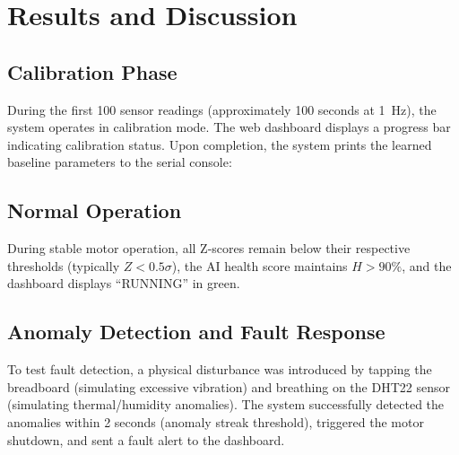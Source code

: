 \documentclass[conference]{IEEEtran}
\begin{document}
\section{Results and Discussion}

\subsection{Calibration Phase}

During the first 100 sensor readings (approximately 100 seconds at 1~Hz), the system operates in calibration mode. The web dashboard displays a progress bar indicating calibration status. Upon completion, the system prints the learned baseline parameters to the serial console:

\vspace{0.3cm}
\noindent{}
\vspace{0.2cm}

\subsection{Normal Operation}

During stable motor operation, all Z-scores remain below their respective thresholds (typically $Z < 0.5\sigma$), the AI health score maintains $H > 90\%$, and the dashboard displays ``RUNNING'' in green.

\vspace{0.3cm}
\noindent{}
\vspace{0.2cm}

\subsection{Anomaly Detection and Fault Response}

To test fault detection, a physical disturbance was introduced by tapping the breadboard (simulating excessive vibration) and breathing on the DHT22 sensor (simulating thermal/humidity anomalies). The system successfully detected the anomalies within 2 seconds (anomaly streak threshold), triggered the motor shutdown, and sent a fault alert to the dashboard.
\end{document}
